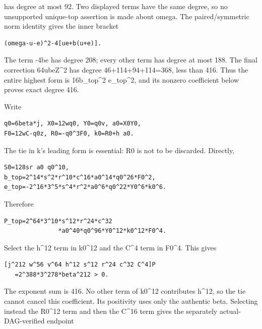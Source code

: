 has degree at most 92. Two displayed terms have the same degree, so no unsupported unique-top assertion is made about omega. The paired/\allowbreak{}symmetric norm identity gives the inner bracket



\begin{verbatim}
(omega-u-e)^2-4[ue+b(u+e)].
\end{verbatim}

The term -4be has degree 208; every other term has degree at most 188. The final correction 64ubeZ\textasciicircum{}\allowbreak{}2 has degree 46+\allowbreak{}114+\allowbreak{}94+\allowbreak{}114=\allowbreak{}368, less than 416. Thus the entire highest form is 16b\_\allowbreak{}top\textasciicircum{}\allowbreak{}2 e\_\allowbreak{}top\textasciicircum{}\allowbreak{}2, and its nonzero coefficient below proves exact degree 416.



Write



\begin{verbatim}
q0=6beta*j, X0=12wq0, Y0=q0v, a0=X0Y0,
F0=12wC-q0z, R0=-q0^3F0, k0=R0+h a0.
\end{verbatim}

The tie in k's leading form is essential: R0 is not to be discarded. Directly,



\begin{verbatim}
S0=128sr a0 q0^10,
b_top=2^14*s^2*r^10*c^16*a0^14*q0^26*F0^2,
e_top=-2^16*3^5*s^4*r^2*a0^6*q0^22*Y0^6*k0^6.
\end{verbatim}

Therefore



\begin{verbatim}
P_top=2^64*3^10*s^12*r^24*c^32
               *a0^40*q0^96*Y0^12*k0^12*F0^4.
\end{verbatim}

Select the h\textasciicircum{}\allowbreak{}12 term in k0\textasciicircum{}\allowbreak{}12 and the C\textasciicircum{}\allowbreak{}4 term in F0\textasciicircum{}\allowbreak{}4. This gives



\begin{verbatim}
[j^212 w^56 v^64 h^12 s^12 r^24 c^32 C^4]P
   =2^388*3^278*beta^212 > 0.
\end{verbatim}

The exponent sum is 416. No other term of k0\textasciicircum{}\allowbreak{}12 contributes h\textasciicircum{}\allowbreak{}12, so the tie cannot cancel this coefficient. Its positivity uses only the authentic beta. Selecting instead the R0\textasciicircum{}\allowbreak{}12 term and then the C\textasciicircum{}\allowbreak{}16 term gives the separately actual-DAG-verified endpoint



